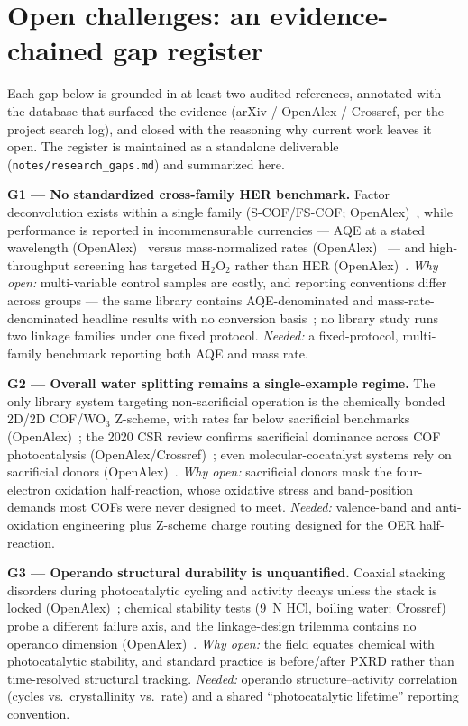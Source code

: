 \section{Open challenges: an evidence-chained gap register}
\label{sec:challenges}

Each gap below is grounded in at least two audited references, annotated with the database that
surfaced the evidence (arXiv / OpenAlex / Crossref, per the project search log), and closed
with the reasoning why current work leaves it open. The register is maintained as a standalone
deliverable (\texttt{notes/research\_gaps.md}) and summarized here.

\textbf{G1 --- No standardized cross-family HER benchmark.} Factor deconvolution exists within
a single family (S-COF/FS-COF; OpenAlex)~\cite{ghosh2020identification}, while performance is
reported in incommensurable currencies --- AQE at a stated wavelength
(OpenAlex)~\cite{li2022covalent} versus mass-normalized rates
(OpenAlex)~\cite{yang2021protonated} --- and high-throughput screening has targeted H$_2$O$_2$
rather than HER (OpenAlex)~\cite{zhao2022accelerated}. \emph{Why open:} multi-variable control
samples are costly, and reporting conventions differ across groups --- the same library
contains AQE-denominated and mass-rate-denominated headline results with no conversion
basis~\cite{li2022covalent,yang2021protonated}; no library study runs two linkage families
under one fixed protocol. \emph{Needed:} a fixed-protocol,
multi-family benchmark reporting both AQE and mass rate.

\textbf{G2 --- Overall water splitting remains a single-example regime.} The only library
system targeting non-sacrificial operation is the chemically bonded 2D/2D COF/WO$_3$ Z-scheme,
with rates far below sacrificial benchmarks (OpenAlex)~\cite{shen2023in}; the 2020 CSR review
confirms sacrificial dominance across COF photocatalysis (OpenAlex/Crossref)~\cite{wang2020covalent};
even molecular-cocatalyst systems rely on sacrificial donors (OpenAlex)~\cite{banerjee2017single}.
\emph{Why open:} sacrificial donors mask the four-electron oxidation half-reaction, whose
oxidative stress and band-position demands most COFs were never designed to meet.
\emph{Needed:} valence-band and anti-oxidation engineering plus Z-scheme charge routing
designed for the OER half-reaction.

\textbf{G3 --- Operando structural durability is unquantified.} Coaxial stacking disorders
during photocatalytic cycling and activity decays unless the stack is locked
(OpenAlex)~\cite{zhou2021peg}; chemical stability tests (9~N HCl, boiling water;
Crossref)~\cite{kandambeth2012construction} probe a different failure axis, and the
linkage-design trilemma contains no operando dimension (OpenAlex)~\cite{haase2020solving}.
\emph{Why open:} the field equates chemical with photocatalytic stability, and standard
practice is before/after PXRD rather than time-resolved structural tracking. \emph{Needed:}
operando structure--activity correlation (cycles vs.\ crystallinity vs.\ rate) and a shared
``photocatalytic lifetime'' reporting convention.

